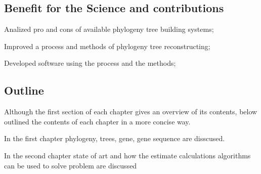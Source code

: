 \subsection*{Benefit for the Science and contributions}
Analized pro and cons of available phylogeny tree building systems;

Improved a process and methods of phylogeny tree reconstructing;

Developed software using the process and the methods;

\subsection*{Outline}
Although the first section of each chapter gives an overview of
its contents, below outlined the contents of each chapter in a more 
concise way.

In the first chapter phylogeny, trees, gene, gene sequence are disscused.

In the second chapter state of art and how the estimate calculations 
algorithms can be used to solve problem are discussed


